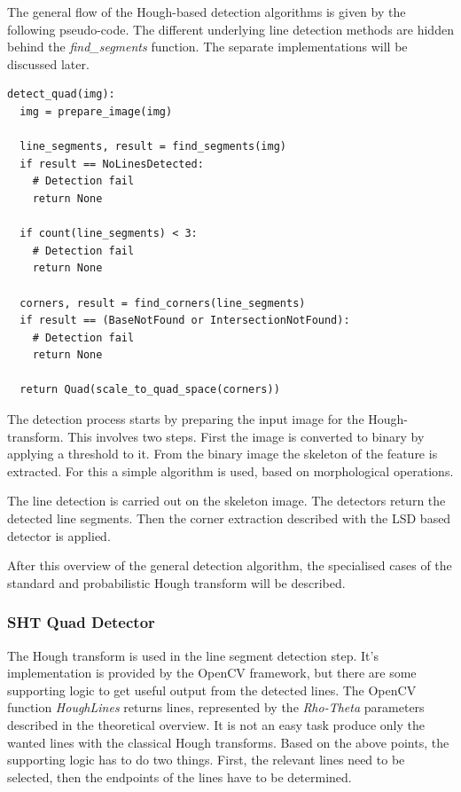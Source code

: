 The general flow of the Hough-based detection algorithms is given by the following pseudo-code.
The different underlying line detection methods are hidden behind the \textit{find\_segments} function.
The separate implementations will be discussed later.
\begin{lstlisting}
detect_quad(img):
  img = prepare_image(img)
	
  line_segments, result = find_segments(img)
  if result == NoLinesDetected:
    # Detection fail
    return None
	
  if count(line_segments) < 3:
    # Detection fail
    return None
	
  corners, result = find_corners(line_segments)
  if result == (BaseNotFound or IntersectionNotFound):
    # Detection fail
    return None
	
  return Quad(scale_to_quad_space(corners))	
\end{lstlisting}

The detection process starts by preparing the input image for the Hough-transform.
This involves two steps.
First the image is converted to binary by applying a threshold to it.
From the binary image the skeleton of the feature is extracted.
For this a simple algorithm is used, based on morphological operations.

The line detection is carried out on the skeleton image.
The detectors return the detected line segments.
Then the corner extraction described with the LSD based detector is applied.

After this overview of the general detection algorithm, the specialised cases of the standard and probabilistic Hough transform will be described.

\subsubsection{SHT Quad Detector}

The Hough transform is used in the line segment detection step.
It's implementation is provided by the OpenCV framework, but there are some supporting logic to get useful output from the detected lines.
The OpenCV function \textit{HoughLines} returns lines, represented by the \textit{Rho-Theta} parameters described in the theoretical overview.
It is not an easy task produce only the wanted lines with the classical Hough transforms.
Based on the above points, the supporting logic has to do two things.
First, the relevant lines need to be selected, then the endpoints of the lines have to be determined.

